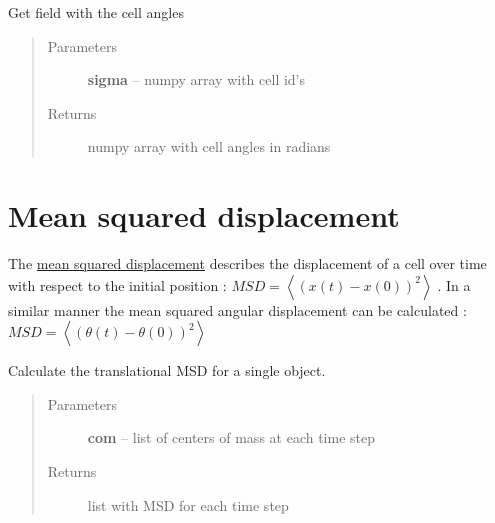 \documentclass[letterpaper,10pt,english]{sphinxmanual}
\begin{document}
\begin{fulllineitems}
\label{AnalysisUtils:AnalysisUtils.getAngleField}
Get field with the cell angles
\begin{quote}\begin{description}
\item[{Parameters}] \leavevmode
\textbf{sigma} -- numpy array with cell id's

\item[{Returns}] \leavevmode
numpy array with cell angles in radians

\end{description}\end{quote}

\end{fulllineitems}



\section{Mean squared displacement}
\label{AnalysisUtils:mean-squared-displacement}
The \href{http://en.wikipedia.org/wiki/Mean\_squared\_displacement}{mean squared displacement} describes the displacement of a cell over time with respect to the initial position : $MSD = \left \langle (x(t) - x(0))^2 \right \rangle\;$. In a similar manner the mean squared angular displacement can be calculated : $MSD = \left \langle (\theta(t) - \theta(0))^2 \right \rangle\;$

\begin{fulllineitems}
\label{AnalysisUtils:AnalysisUtils.calcMSDTransForCellTC}
Calculate the translational MSD for a single object.
\begin{quote}\begin{description}
\item[{Parameters}] \leavevmode
\textbf{com} -- list of centers of mass at each time step

\item[{Returns}] \leavevmode
list with MSD for each time step

\end{description}\end{quote}

\end{fulllineitems}
\end{document}
